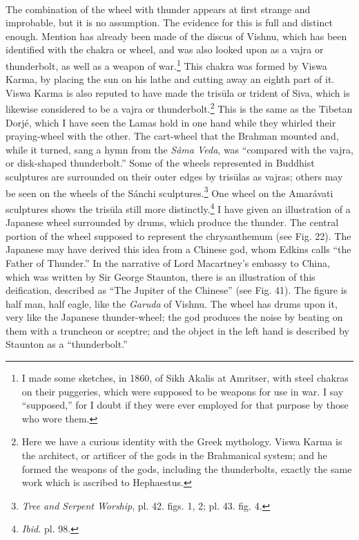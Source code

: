 \documentclass[a4paper, 11pt, oneside, polutonikogreek, english]{article}
\begin{document}
\paragraph{}
The combination of the wheel with thunder appears at first strange and improbable, but it is no assumption. The evidence for this is full and distinct enough. Mention has already been made of the discus of Vishnu, which has been identified with the chakra or wheel, and was also looked upon as a vajra or thunderbolt, as well as a weapon of war.\footnote{I made some sketches, in 1860, of Sikh Akalis at Amritser, with steel chakras on their puggeries, which were supposed to be weapons for use in war. I say ``supposed,'' for I doubt if they were ever employed for that purpose by those who wore them.} This chakra was formed by Viswa Karma, by placing the sun on his lathe and cutting away an eighth part of it. Viswa Karma is also reputed to have made the trisūla or trident of Siva, which is likewise considered to be a vajra or thunderbolt.\footnote{Here we have a curious identity with the Greek mythology. Viswa Karma is the architect, or artificer of the gods in the Brahmanical system; and he formed the weapons of the gods, including the thunderbolts, exactly the same work which is ascribed to Hephaestus.} This is the same as the Tibetan Dorjé, which I have seen the Lamas hold in one hand while they whirled their praying-wheel with the other. The cart-wheel that the Brahman mounted and, while it turned, sang a hymn from the \emph{Sâma Veda}, was ``compared with the vajra, or disk-shaped thunderbolt.'' Some of the wheels represented in Buddhist sculptures are surrounded on their outer edges by trisūlas as vajras; others may be seen on the wheels of the Sánchi sculptures.\footnote{\emph{Tree and Serpent Worship}, pl. 42. figs. 1, 2; pl. 43. fig. 4.} One wheel on the Amarávati sculptures shows the trisūla still more distinctly.\footnote{\emph{Ibid.} pl. 98.} I have given an illustration of a Japanese wheel surrounded by drums, which produce the thunder. The central portion of the wheel supposed to represent the chrysanthemum (see Fig. 22). The Japanese may have derived this idea from a Chinese god, whom Edkins calls ``the Father of Thunder.'' In the narrative of Lord Macartney's embassy to China, which was written by Sir George Staunton, there is an illustration of this deification, described as ``The Jupiter of the Chinese'' (see Fig. 41). The figure is half man, half eagle, like the \emph{Garuda} of Vishnu. The wheel has drums upon it, very like the Japanese thunder-wheel; the god produces the noise by beating on them with a truncheon or sceptre; and the object in the left hand is described by Staunton as a ``thunderbolt.''
\end{document}
